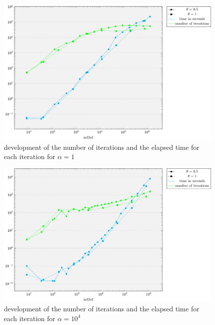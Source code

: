 \documentclass[draft=false,twoside,12pt]{scrreprt}
\begin{document}
\vspace{-\parskip}
\begin{figure}[H]
	\centering
	\includegraphics[width=16cm]{tikzPlots/f01/alpha1/misc.pdf}
  \caption{development of the number of iterations and the elapsed time for 
  each iteration for $\alpha=1$}
\end{figure}

\vspace{-\parskip}
\begin{figure}[H]
	\centering
	\includegraphics[width=16cm]{tikzPlots/f01/alpha1e4/misc.pdf}
  \caption{development of the number of iterations and the elapsed time for 
  each iteration for $\alpha=10^4$}
\end{figure}

\end{document}
